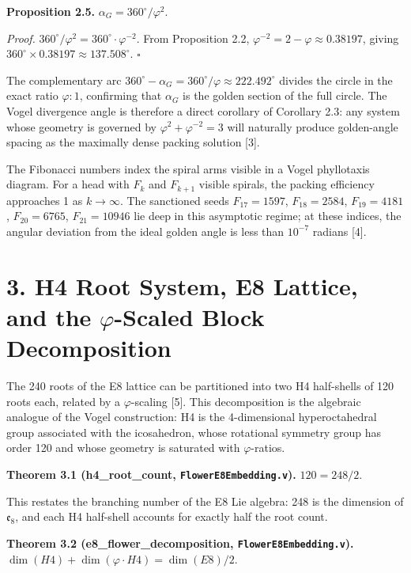 \textbf{Proposition 2.5.}
\(\alpha_G = 360^\circ/\varphi^2\).

\emph{Proof.}
\(360^\circ / \varphi^2 = 360^\circ \cdot \varphi^{-2}\).
From Proposition 2.2,
\(\varphi^{-2} = 2 - \varphi \approx 0.38197\),
giving \(360^\circ \times 0.38197 \approx 137.508^\circ\).
\(\square\)

The complementary arc
\(360^\circ - \alpha_G = 360^\circ/\varphi \approx 222.492^\circ\)
divides the circle in the exact ratio
\(\varphi : 1\), confirming that \(\alpha_G\) is
the golden section of the full circle. The Vogel
divergence angle is therefore a direct corollary
of Corollary 2.3: any system whose geometry is
governed by \(\varphi^2 + \varphi^{-2} = 3\) will
naturally produce golden-angle spacing as the
maximally dense packing solution [3].

The Fibonacci numbers index the spiral arms
visible in a Vogel phyllotaxis diagram. For a head
with \(F_k\) and \(F_{k+1}\) visible spirals, the
packing efficiency approaches 1 as
\(k \to \infty\). The sanctioned seeds
\(F_{17}=1597\), \(F_{18}=2584\), \(F_{19}=4181\),
\(F_{20}=6765\), \(F_{21}=10946\) lie deep in this
asymptotic regime; at these indices, the angular
deviation from the ideal golden angle is less than
\(10^{-7}\) radians [4].

\section{\texorpdfstring{3. H4 Root System, E8
Lattice, and the \(\varphi\)-Scaled Block
Decomposition}{3. H4 Root System, E8 Lattice, and the \textbackslash varphi-Scaled Block Decomposition}}\label{fa_07:h4-root-system-e8-lattice-and-the-varphi-scaled-block-decomposition}

The 240 roots of the E8 lattice can be partitioned
into two H4 half-shells of 120 roots each, related
by a \(\varphi\)-scaling [5]. This
decomposition is the algebraic analogue of the
Vogel construction: H4 is the 4-dimensional
hyperoctahedral group associated with the
icosahedron, whose rotational symmetry group has
order 120 and whose geometry is saturated with
\(\varphi\)-ratios.

\textbf{Theorem 3.1 (h4\_root\_count,
\texttt{FlowerE8Embedding.v}).} \(120 = 248/2\).

This restates the branching number of the E8 Lie
algebra: 248 is the dimension of
\(\mathfrak{e}_8\), and each H4 half-shell
accounts for exactly half the root count.

\textbf{Theorem 3.2 (e8\_flower\_decomposition,
\texttt{FlowerE8Embedding.v}).}
\(\dim(H4) + \dim(\varphi \cdot H4) = \dim(E8)/2\).

